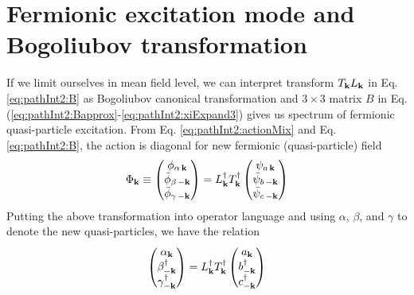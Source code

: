 \section{Fermionic excitation mode and Bogoliubov transformation}
If we limit ourselves in mean field level, we can interpret transform $T_{\mathbf{k}}{}L_{\mathbf{k}}$ in Eq. \eqref{eq:pathInt2:B} as Bogoliubov canonical transformation and $3\times3$ matrix $B$ in Eq. (\ref{eq:pathInt2:Bapprox}-\ref{eq:pathInt2:xiExpand3}) gives us spectrum of fermionic quasi-particle excitation. From Eq. \eqref{eq:pathInt2:actionMix} and Eq. \eqref{eq:pathInt2:B}, the action is diagonal for new fermionic (quasi-particle) field 
\begin{equation*}
\Phi_{\mathbf{k}}\equiv\begin{pmatrix}\phi_{\alpha\,\mathbf{k}}\\\bar\phi_{\beta\,-\mathbf{k}}\\\bar\phi_{\gamma\,-\mathbf{k}}\end{pmatrix}
=L^{\dagger}_{\mathbf{k}}T^{\dagger}_{\mathbf{k}}\begin{pmatrix}\psi_{a\,\mathbf{k}}\\\bar\psi_{b\,-\mathbf{k}}\\\bar\psi_{c\,-\mathbf{k}}\end{pmatrix}
\end{equation*}
Putting the above transformation into operator language and using $\alpha$, $\beta$, and $\gamma$ to denote the new quasi-particles,  we have the relation
\begin{equation}
\begin{pmatrix}\alpha_{\mathbf{k}}\\\beta_{-\mathbf{k}}^{\dagger}\\\gamma_{-\mathbf{k}}^{\dagger}\end{pmatrix}
=L^{\dagger}_{\mathbf{k}}T^{\dagger}_{\mathbf{k}}  \begin{pmatrix}a_{\mathbf{k}}\\b_{-\mathbf{k}}^{\dagger}\\c_{-\mathbf{k}}^{\dagger}\end{pmatrix}
\end{equation}   

